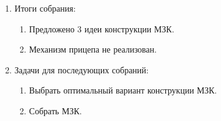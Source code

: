 \begin{enumerate}
\begin{enumerate}
	\end{enumerate}
	
	\item Итоги собрания: 
	\begin{enumerate}
		\item Предложено 3 идеи конструкции МЗК.
		
		\item Механизм прицепа не реализован.
		
	\end{enumerate}
	
	\item Задачи для последующих собраний:
	\begin{enumerate}
		\item Выбрать оптимальный вариант конструкции МЗК.
		
		\item Собрать МЗК.
		
	\end{enumerate}     
\end{enumerate}
\fillpage

